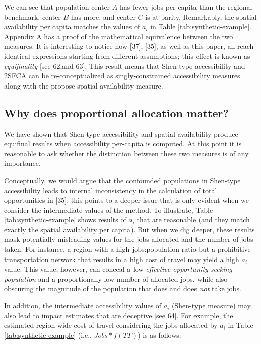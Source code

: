 \documentclass[10pt,letterpaper]{article}
\begin{document}
We can see that population center \(A\) has fewer jobs per capita than
the regional benchmark, center \(B\) has more, and center \(C\) is at
parity. Remarkably, the spatial availability per capita matches the
values of \(a_i\) in Table \ref{tab:synthetic-example}. Appendix A has a
proof of the mathematical equivalence between the two measures. It is
interesting to notice how {[}37{]}, {[}35{]}, as well as this paper, all
reach identical expressions starting from different assumptions; this
effect is known as \emph{equifinality} {[}see 62,and 63{]}. This result
means that Shen-type accessibility and 2SFCA can be re-conceptualized as
singly-constrained accessibility measures along with the propose spatial
availability measure.

\hypertarget{why-does-proportional-allocation-matter}{%
\subsection{Why does proportional allocation
matter?}\label{why-does-proportional-allocation-matter}}

We have shown that Shen-type accessibility and spatial availability
produce equifinal results when accessibility per-capita is computed. At
this point it is reasonable to ask whether the distinction between these
two measures is of any importance.

Conceptually, we would argue that the confounded populations in
Shen-type accessibility leads to internal inconsistency in the
calculation of total opportunities in {[}35{]}: this points to a deeper
issue that is only evident when we consider the intermediate values of
the method. To illustrate, Table \ref{tab:synthetic-example} shows
results of \(a_i\) that are reasonable (and they match exactly the
spatial availability per capita). But when we dig deeper, these results
mask potentially misleading values for the jobs allocated and the number
of jobs taken. For instance, a region with a high jobs:population ratio
but a prohibitive transportation network that results in a high cost of
travel may yield a high \(a_i\) value. This value, however, can conceal
a low \emph{effective opportunity-seeking population} and a
proportionally low number of allocated jobs, while also obscuring the
magnitude of the population that does and does \emph{not} take jobs.

In addition, the intermediate accessibility values of \(a_i\) (Shen-type
measure) may also lead to impact estimates that are deceptive {[}see
64{]}. For example, the estimated region-wide cost of travel considering
the jobs allocated by \(a_i\) in Table \ref{tab:synthetic-example}
(i.e., \(Jobs*f(TT)\)) is as follows:
\end{document}
